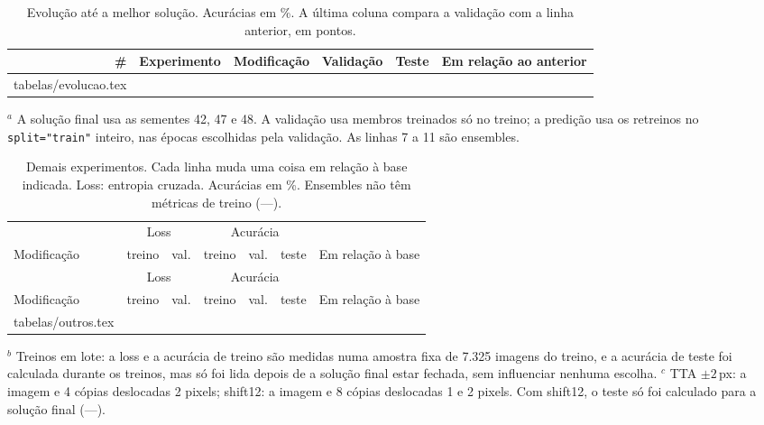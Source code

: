 \documentclass[11pt,a4paper]{article}
\makeatletter
\newcommand{\linhas}[1]{\@@input #1 }
\makeatother
\begin{document}
\begin{table}[H]
\centering\small
\caption{Evolução até a melhor solução. Acurácias em \%. A última coluna compara a validação com a linha
anterior, em pontos.}\label{tab:evol}
\begin{tabular}{r>{\raggedright}p{2.8cm}>{\raggedright}p{5.6cm}rr>{\raggedright\arraybackslash}p{3.3cm}}
\toprule
\# & Experimento & Modificação & Validação & Teste & Em relação ao anterior \\
\midrule
\linhas{tabelas/evolucao.tex}
\bottomrule
\end{tabular}
\par\vspace{0.3em}
\begin{minipage}{0.97\textwidth}\footnotesize
$^a$ A solução final usa as sementes 42, 47 e 48. A validação usa membros treinados só no treino;
a predição usa os
retreinos no \texttt{split="train"} inteiro, nas épocas escolhidas pela validação. As linhas 7 a 11 são ensembles.
\end{minipage}
\end{table}

{\small
\setlength{\tabcolsep}{3pt}
\begin{longtable}{>{\raggedright}p{6.9cm}rrrrr>{\raggedright\arraybackslash}p{2.9cm}}
\caption{Demais experimentos. Cada linha muda uma coisa em relação à base indicada. Loss: entropia cruzada.
Acurácias em \%. Ensembles não têm métricas de treino (---).}\label{tab:outros}\\
\toprule
 & \multicolumn{2}{c}{Loss} & \multicolumn{3}{c}{Acurácia} & \\
Modificação & treino & val. & treino & val. & teste & Em relação à base \\
\midrule
\endfirsthead
\toprule
 & \multicolumn{2}{c}{Loss} & \multicolumn{3}{c}{Acurácia} & \\
Modificação & treino & val. & treino & val. & teste & Em relação à base \\
\midrule
\endhead
\bottomrule
\endfoot
\linhas{tabelas/outros.tex}
\end{longtable}
}
\vspace{-0.8em}
{\footnotesize
$^b$ Treinos em lote: a loss e a acurácia de treino são medidas numa amostra fixa de 7.325 imagens do treino, e
a acurácia de teste foi calculada durante os treinos, mas só foi lida depois de a solução final estar fechada,
sem influenciar nenhuma escolha. \quad
$^c$ TTA $\pm2$\,px: a imagem e 4 cópias deslocadas 2 pixels; shift12: a imagem e 8 cópias deslocadas 1 e 2
pixels. Com shift12, o teste só foi calculado para a solução final (---).
\par}
\end{document}
